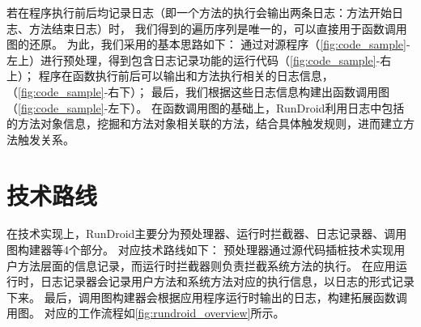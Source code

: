 若在程序执行前后均记录日志（即一个方法的执行会输出两条日志：方法开始日志、方法结束日志）时，
我们得到的遍历序列是唯一的，可以直接用于函数调用图的还原。
为此，我们采用的基本思路如下：
通过对源程序（\autoref{fig:code_sample}-左上）进行预处理，得到包含日志记录功能的运行代码（\autoref{fig:code_sample}-右上）；
程序在函数执行前后可以输出和方法执行相关的日志信息，（\autoref{fig:code_sample}-右下）；
最后，我们根据这些日志信息构建出函数调用图（\autoref{fig:code_sample}-左下）。
在函数调用图的基础上，RunDroid利用日志中包括的方法对象信息，挖掘和方法对象相关联的方法，结合具体触发规则，进而建立方法触发关系。




\section{技术路线}

在技术实现上，RunDroid主要分为预处理器、运行时拦截器、日志记录器、调用图构建器等4个部分。
对应技术路线如下：
预处理器通过源代码插桩技术实现用户方法层面的信息记录，而运行时拦截器则负责拦截系统方法的执行。
在应用运行时，日志记录器会记录用户方法和系统方法对应的执行信息，以日志的形式记录下来。
最后，调用图构建器会根据应用程序运行时输出的日志，构建拓展函数调用图。
对应的工作流程如\autoref{fig:rundroid_overview}所示。




